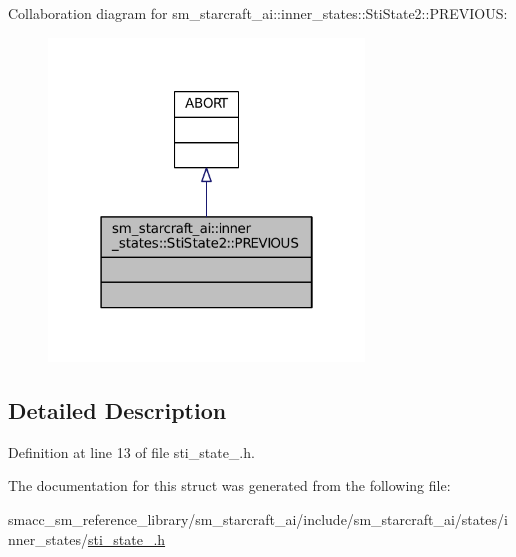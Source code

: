 Collaboration diagram for sm\+\_\+starcraft\+\_\+ai\+:\+:inner\+\_\+states\+:\+:Sti\+State2\+:\+:P\+R\+E\+V\+I\+O\+US\+:
\nopagebreak
\begin{figure}[H]
\begin{center}
\leavevmode
\includegraphics[width=238pt]{structsm__starcraft__ai_1_1inner__states_1_1StiState2_1_1PREVIOUS__coll__graph}
\end{center}
\end{figure}


\subsection{Detailed Description}


Definition at line 13 of file sti\+\_\+state\+\_.\+h.



The documentation for this struct was generated from the following file\+:\begin{DoxyCompactItemize}
\item 
smacc\+\_\+sm\+\_\+reference\+\_\+library/sm\+\_\+starcraft\+\_\+ai/include/sm\+\_\+starcraft\+\_\+ai/states/inner\+\_\+states/\hyperlink{sm__starcraft__ai_2include_2sm__starcraft__ai_2states_2inner__states_2sti__state__2_8h}{sti\+\_\+state\+\_.\+h}\end{DoxyCompactItemize}
